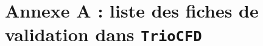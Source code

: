 \documentclass[10pt,twoside,a4paper]{memoir}
\begin{document}
\section*{\label{sec:Annexe_ListeValid}Annexe A : liste des fiches de validation dans \texttt{TrioCFD}}
\normalsize \normalfont

\pagebreak
\lhead{}


\end{document}
